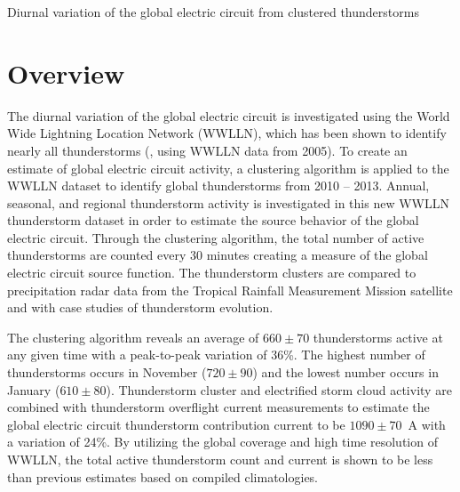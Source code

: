 
Diurnal variation of the global electric circuit from clustered thunderstorms

\section{Overview}


The diurnal variation of the global electric circuit is investigated using the World Wide Lightning Location Network (WWLLN), which has been shown to identify nearly all thunderstorms (\citet{Jacobson2006c}, using WWLLN data from 2005).
To create an estimate of global electric circuit activity, a clustering algorithm is applied to the WWLLN dataset to identify global thunderstorms from 2010 -- 2013.
Annual, seasonal, and regional thunderstorm activity is investigated in this new WWLLN thunderstorm dataset in order to estimate the source behavior of the global electric circuit.
Through the clustering algorithm, the total number of active thunderstorms are counted every 30 minutes creating a measure of the global electric circuit source function.
The thunderstorm clusters are compared to precipitation radar data from the Tropical Rainfall Measurement Mission satellite and with case studies of thunderstorm evolution.

The clustering algorithm reveals an average of $660 \pm 70$ thunderstorms active at any given time with a peak-to-peak variation of 36\%.
The highest number of thunderstorms occurs in November ($720 \pm 90$) and the lowest number occurs in January ($610 \pm 80$).
Thunderstorm cluster and electrified storm cloud activity are combined with thunderstorm overflight current measurements to estimate the global electric circuit thunderstorm contribution current to be $1090 \pm 70$~A with a variation of 24\%.
By utilizing the global coverage and high time resolution of WWLLN, the total active thunderstorm count and current is shown to be less than previous estimates based on compiled climatologies.

